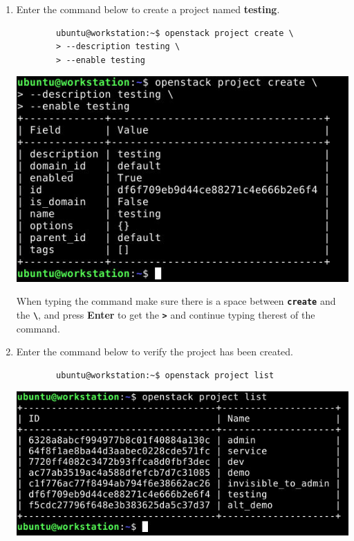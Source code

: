 \documentclass[letterpaper, 12pt]{article}
\begin{document}
\begin{enumerate}
    \item Enter the command below to create a project named \textbf{testing}.
    \begin{lstlisting}
        ubuntu@workstation:~$ openstack project create \
        > --description testing \
        > --enable testing
    \end{lstlisting}

    \begin{center}
        \includegraphics[width=\linewidth]{images/part2/step4.png}
    \end{center}

    \begin{tipbox}
        When typing the command make sure there is a space between \textbf{\texttt{create}} and the
        \textbf{\texttt{\textbackslash}}, and press \textbf{Enter} to get the \textbf{\texttt{>}} and continue typing
        therest of the command.
    \end{tipbox}

    \item Enter the command below to verify the project has been created.
    \begin{lstlisting}
        ubuntu@workstation:~$ openstack project list
    \end{lstlisting}

    \begin{center}
        \includegraphics[width=\linewidth]{images/part2/step5.png}
    \end{center}


\end{enumerate}
\end{document}
